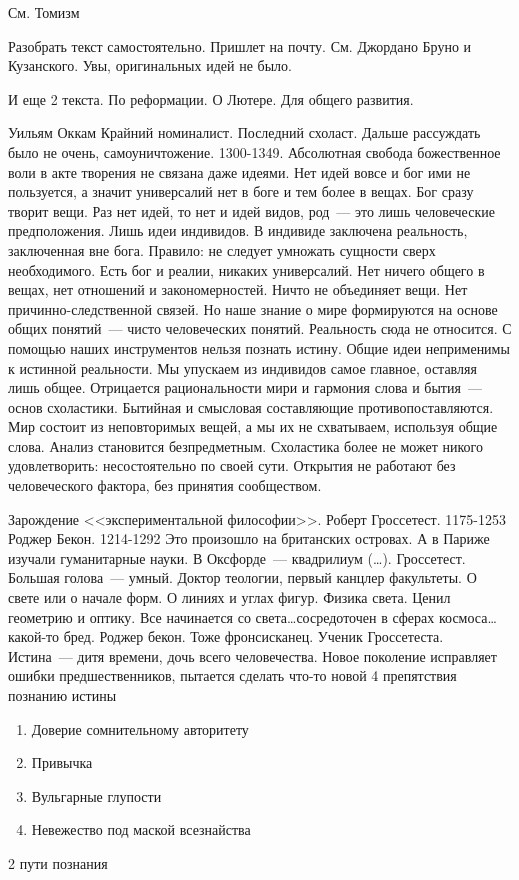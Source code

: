 См. Томизм

Разобрать текст самостоятельно. Пришлет на почту. См. Джордано Бруно и Кузанского. Увы, оригинальных идей не было.

И еще 2 текста. По реформации. О Лютере. Для общего развития.

Уильям Оккам
Крайний номиналист. Последний схоласт. Дальше рассуждать было не очень, самоуничтожение. 1300-1349.
Абсолютная свобода божественное воли в акте творения не связана даже идеями. Нет идей вовсе и бог ими не пользуется, а значит универсалий нет в боге и тем более в вещах. Бог сразу творит вещи. Раз нет идей, то нет и идей видов, род~--- это лишь человеческие предположения. Лишь идеи индивидов. В индивиде заключена реальность, заключенная вне бога. Правило: не следует умножать сущности сверх необходимого. Есть бог и реалии, никаких универсалий. Нет ничего общего в вещах, нет отношений и закономерностей. Ничто не объединяет вещи. Нет причинно-следственной связей. Но наше знание о мире формируются на основе общих понятий~--- чисто человеческих понятий. Реальность сюда не относится. С помощью наших инструментов нельзя познать истину. Общие идеи неприменимы к истинной реальности. Мы упускаем из индивидов самое главное, оставляя лишь общее. Отрицается рациональности мири и гармония слова и бытия~--- основ схоластики. Бытийная и смысловая составляющие противопоставляются. Мир состоит из неповторимых вещей, а мы их не схватываем, используя общие слова. Анализ становится безпредметным. Схоластика более не может никого удовлетворить: несостоятельно по своей сути.
Открытия не работают без человеческого фактора, без принятия сообществом.

Зарождение <<экспериментальной философии>>.
Роберт Гроссетест. 1175-1253
Роджер Бекон. 1214-1292
Это произошло на британских островах. А в Париже изучали гуманитарные науки. В Оксфорде~--- квадрилиум (\ldots). 
Гроссетест. Большая голова~--- умный. Доктор теологии, первый канцлер факультеты. О свете или о начале форм. О линиях и углах фигур. Физика света. Ценил геометрию и оптику. Все начинается со света\ldots сосредоточен в сферах космоса\ldots какой-то бред.
Роджер бекон. Тоже фронсисканец. Ученик Гроссетеста. Истина~--- дитя времени, дочь всего человечества. Новое поколение исправляет ошибки предшественников, пытается сделать что-то новой
4 препятствия познанию истины

\begin{enumerate}
	\item Доверие сомнительному авторитету
	\item Привычка
	\item Вульгарные глупости
	\item Невежество под маской всезнайства
\end{enumerate}
2 пути познания

